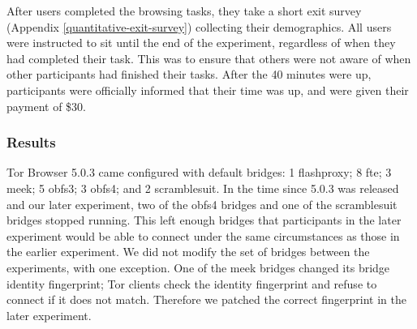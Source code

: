 \documentclass{template}
\begin{document}
After users completed the browsing tasks, they take a short exit survey (Appendix \ref{quantitative-exit-survey})
collecting their demographics. All users were instructed to sit until the end of the experiment,
regardless of when they had completed their task. This was to ensure that others were not 
aware of when other participants had finished their tasks. After the 40 minutes were up, 
participants were officially informed that their time was up, and were given their payment of 
\$30. 

\subsubsection{Results}

Tor Browser 5.0.3 came configured with default bridges:
1 flashproxy;
8 fte;
3 meek;
5 obfs3;
3 obfs4;
and 2 scramblesuit.
In the time since 5.0.3 was released and our later experiment,
two of the obfs4 bridges and one of the scramblesuit bridges stopped running.
This left enough bridges that participants in the later experiment would be able to connect
under the same circumstances as those in the earlier experiment.
We did not modify the set of bridges between the experiments,
with one exception.
One of the meek bridges changed its bridge identity fingerprint;
Tor clients check the identity fingerprint and refuse to connect
if it does not match.
Therefore we patched the correct fingerprint in the later experiment.
\end{document}
